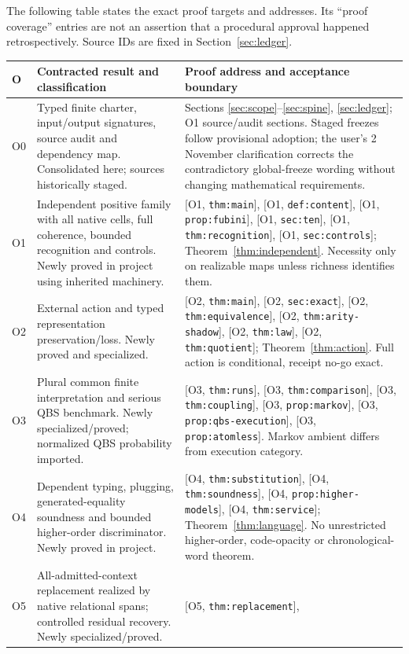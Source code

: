 \documentclass[11pt,a4paper]{article}
\theoremstyle{definition}
\newcommand{\Addr}[2]{\textup{[#1, \texttt{#2}]}}
\begin{document}
The following table states the exact proof targets and addresses. Its
``proof coverage'' entries are not an assertion that a procedural approval
happened retrospectively. Source IDs are fixed in Section~\ref{sec:ledger}.
\small
\begin{longtable}{@{}p{.06\linewidth}p{.37\linewidth}p{.46\linewidth}@{}}
\toprule O&Contracted result and classification&Proof address and acceptance boundary\\\midrule\endhead
O0&Typed finite charter, input/output signatures, source audit and dependency
map. Consolidated here; sources historically staged.&Sections
\ref{sec:scope}--\ref{sec:spine}, \ref{sec:ledger}; O1 source/audit sections.
Staged freezes follow provisional adoption; the user's 2 November
clarification corrects the contradictory global-freeze wording without
changing mathematical requirements.\\
O1&Independent positive family with all native cells, full coherence,
bounded recognition and controls. Newly proved in project using inherited
machinery.&\Addr{O1}{thm:main}, \Addr{O1}{def:content},
\Addr{O1}{prop:fubini}, \Addr{O1}{sec:ten},
\Addr{O1}{thm:recognition}, \Addr{O1}{sec:controls};
Theorem~\ref{thm:independent}. Necessity only on realizable maps unless
richness identifies them.\\
O2&External action and typed representation preservation/loss. Newly proved
and specialized.&\Addr{O2}{thm:main}, \Addr{O2}{sec:exact},
\Addr{O2}{thm:equivalence}, \Addr{O2}{thm:arity-shadow},
\Addr{O2}{thm:law}, \Addr{O2}{thm:quotient};
Theorem~\ref{thm:action}. Full action is conditional, receipt no-go exact.\\
O3&Plural common finite interpretation and serious QBS benchmark. Newly
specialized/proved; normalized QBS probability imported.&\Addr{O3}{thm:runs},
\Addr{O3}{thm:comparison}, \Addr{O3}{thm:coupling},
\Addr{O3}{prop:markov}, \Addr{O3}{prop:qbs-execution},
\Addr{O3}{prop:atomless}. Markov ambient differs from execution category.\\
O4&Dependent typing, plugging, generated-equality soundness and bounded
higher-order discriminator. Newly proved in project.&\Addr{O4}{thm:substitution},
\Addr{O4}{thm:soundness}, \Addr{O4}{prop:higher-models},
\Addr{O4}{thm:service}; Theorem~\ref{thm:language}. No unrestricted
higher-order, code-opacity or chronological-word theorem.\\
O5&All-admitted-context replacement realized by native relational spans;
controlled residual recovery. Newly specialized/proved.&\Addr{O5}{thm:replacement},

\end{longtable}
\end{document}
